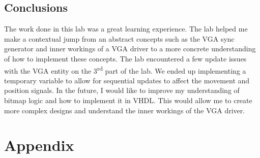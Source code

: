 \documentclass{article}
\begin{document}
\subsection*{Conclusions}
The work done in this lab was a great learning experience. The lab helped me make a contextual jump from an abstract concepts such as the VGA sync generator and inner workings of a VGA driver to a more concrete understanding of how to implement these concepts. The lab encountered a few update issues with the VGA entity on the 3\textsuperscript{rd} part of the lab. We ended up implementing a temporary variable to allow for sequential updates to affect the movement and position signals. In the future, I would like to improve my understanding of bitmap logic and how to implement it in VHDL. This would allow me to create more complex designs and understand the inner workings of the VGA driver.

\section*{Appendix}
\end{document}
